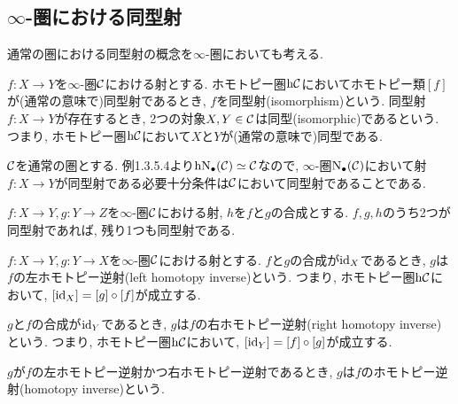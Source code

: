 \documentclass[uplatex, a4paper, 14Q, dvipdfmx]{jsreport}
\begin{document}
\subsection{\texorpdfstring{$\infty$}{infty}-圏における同型射}

通常の圏における同型射の概念を$\infty$-圏においても考える. 

\begin{definition}
  $f: X \to Y$を$\infty$-圏$\mathcal{C}$における射とする. 
  ホモトピー圏$\mathrm{h} \mathcal{C}$においてホモトピー類$[f]$が(通常の意味で)同型射であるとき, $f$を同型射(isomorphism)という.
  同型射$f: X \to Y$が存在するとき, 2つの対象$X,Y \in \mathcal{C}$は同型(isomorphic)であるという. 
  つまり, ホモトピー圏$\mathrm{h} \mathcal{C}$において$X$と$Y$が(通常の意味で)同型である.
\end{definition}

\begin{example}
  $\mathcal{C}$を通常の圏とする. 
  例1.3.5.4より$\mathrm{h} \mathrm{N}_{\bullet}(\mathcal{C}) \simeq \mathcal{C}$なので, $\infty$-圏$\mathrm{N}_{\bullet} (\mathcal{C})$において射$f: X \to Y$が同型射である必要十分条件は$\mathcal{C}$において同型射であることである. 
\end{example}

\begin{remark}
  $f: X \to Y, g: Y \to Z$を$\infty$-圏$\mathcal{C}$における射, $h$を$f$と$g$の合成とする. 
  $f,g,h$のうち2つが同型射であれば, 残り1つも同型射である. 
\end{remark}

\begin{definition}
  $f: X \to Y, g: Y \to X$を$\infty$-圏$\mathcal{C}$における射とする. 
  $f$と$g$の合成が$\mathrm{id}_X$であるとき, $g$は$f$の左ホモトピー逆射(left homotopy inverse)という. 
  つまり, ホモトピー圏$\mathrm{h} \mathcal{C}$において, $[\mathrm{id}_X]=[g] \circ [f]$が成立する. 
  \begin{center}
  \end{center}
  $g$と$f$の合成が$\mathrm{id}_Y$であるとき, $g$は$f$の右ホモトピー逆射(right homotopy inverse)という. 
  つまり, ホモトピー圏$\mathrm{h} \mathcal{C}$において, $[\mathrm{id}_Y]=[f] \circ [g]$が成立する. 
  \begin{center}
  \end{center}
  $g$が$f$の左ホモトピー逆射かつ右ホモトピー逆射であるとき, $g$は$f$のホモトピー逆射(homotopy inverse)という. 
\end{definition}
\end{document}
